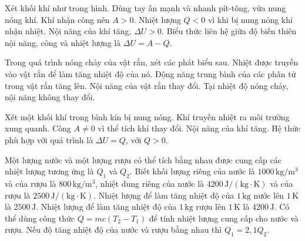 \begin{ex}
Xét khối khí như trong hình. Dùng tay ấn mạnh và nhanh pít-tông, vừa nung nóng khí.
\choiceTF
{\True Khí nhận công nên $A>0$.}
{Nhiệt lượng $Q<0$ vì khi bị nung nóng khí nhận nhiệt.}
{\True Nội năng của khí tăng, $\Delta U>0$.}
{Biểu thức liên hệ giữa độ biến thiên nội năng, công và nhiệt lượng là $\Delta U=A-Q$.}
\end{ex}
\begin{ex}
Trong quá trình nóng chảy của vật rắn, xét các phát biểu sau.
\choiceTF
{Nhiệt được truyền vào vật rắn để làm tăng nhiệt độ của nó.}
{Động năng trung bình của các phân tử trong vật rắn tăng lên.}
{\True Nội năng của vật rắn thay đổi.}
{Tại nhiệt độ nóng chảy, nội năng không thay đổi.}
\end{ex}
\begin{ex}
Xét một khối khí trong bình kín bị nung nóng.
\choiceTF
{Khí truyền nhiệt ra môi trường xung quanh.}
{Công $A\ne0$ vì thể tích khí thay đổi.}
{\True Nội năng của khí tăng.}
{\True Hệ thức phù hợp với quá trình là $\Delta U=Q$, với $Q>0$.}
\end{ex}
\begin{ex}
Một lượng nước và một lượng rượu có thể tích bằng nhau được cung cấp các nhiệt lượng tương ứng là $Q_1$ và $Q_2$. Biết khối lượng riêng của nước là $1000\,\mathrm{kg/m^3}$ và của rượu là $800\,\mathrm{kg/m^3}$, nhiệt dung riêng của nước là $4200\,\mathrm{J/(kg\cdot K)}$ và của rượu là $2500\,\mathrm{J/(kg\cdot K)}$.
\choiceTF
{Nhiệt lượng để làm tăng nhiệt độ của $1\,\mathrm{kg}$ nước lên $1\,\mathrm{K}$ là $2500\,\mathrm{J}$.}
{Nhiệt lượng để làm tăng nhiệt độ của $1\,\mathrm{kg}$ rượu lên $1\,\mathrm{K}$ là $4200\,\mathrm{J}$.}
{\True Có thể dùng công thức $Q=mc(T_2-T_1)$ để tính nhiệt lượng cung cấp cho nước và rượu.}
{\True Nếu độ tăng nhiệt độ của nước và rượu bằng nhau thì $Q_1=2{,}1Q_2$.}
\end{ex}

